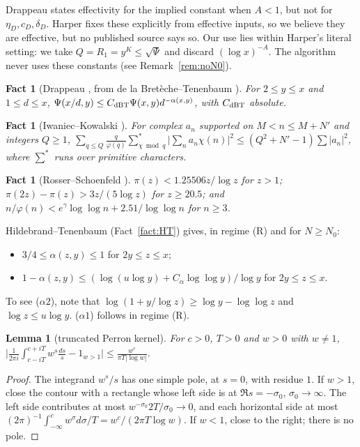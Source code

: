 \documentclass[11pt]{amsart}
\newtheorem{lemma}[theorem]{Lemma}
\newtheorem{fact}[theorem]{Fact}
\theoremstyle{definition}
\begin{document}
\noindent Drappeau states effectivity for the implied constant when $A<1$, but not for $\eta_D,c_D,\delta_D$. Harper fixes
these explicitly from effective inputs, so we believe they are effective, but no published source says so. Our use lies within Harper's
literal setting: we take $Q=R_1=y^K\le\sqrt{\Psi}$ and discard $(\log x)^{-A}$. The algorithm never uses these constants (see
Remark~\ref{rem:noN0}).

\begin{fact}[Drappeau {\cite[Lemme~1(i)]{drappeau2015}}, from de la Bret\`eche--Tenenbaum {\cite[Thm.~2.4(i)]{dbt2005}}]\label{fact:dBT}
For $2\le y\le x$ and $1\le d\le x$, $\Psi(x/d,y)\le C_{\rm dBT}\Psi(x,y)d^{-\alpha(x,y)}$, with $C_{\rm dBT}$ absolute.
\end{fact}

\begin{fact}[Iwaniec--Kowalski {\cite[Thm.~7.13]{ik2004}}]\label{fact:IK}
For complex $a_n$ supported on $M<n\le M+N'$ and integers $Q\ge1$,
$\sum_{q\le Q}\frac q{\varphi(q)}\sum^*_{\chi\bmod q}\bigl|\sum_na_n\chi(n)\bigr|^2\le(Q^2+N'-1)\sum|a_n|^2$, where $\sum^*$ runs over primitive characters.
\end{fact}

\begin{fact}[Rosser--Schoenfeld \cite{rs1962}]\label{fact:RS}
$\pi(z)<1.25506z/\log z$ for $z>1$; $\pi(2z)-\pi(z)>3z/(5\log z)$ for $z\ge20.5$; and $n/\varphi(n)<e^\gamma\log\log n+2.51/\log\log n$ for $n\ge3$.
\end{fact}

\noindent Hildebrand--Tenenbaum (Fact~\ref{fact:HT}) gives, in regime (R) and for $N\ge N_0$:
\begin{itemize}
\item[($\alpha1$)] $3/4\le\alpha(z,y)\le1$ for $2y\le z\le x$;
\item[($\alpha2$)] $1-\alpha(z,y)\le(\log(u\log y)+C_\alpha\log\log y)/\log y$ for $2y\le z\le x$.
\end{itemize}
To see ($\alpha2$), note that $\log(1+y/\log z)\ge\log y-\log\log z$ and $\log z\le u\log y$. ($\alpha1$) follows in regime (R).

\begin{lemma}[truncated Perron kernel]\label{lem:perron}
For $c>0$, $T>0$ and $w>0$ with $w\ne1$,
$\bigl|\frac1{2\pi i}\int_{c-iT}^{c+iT}w^s\frac{ds}s-1_{w>1}\bigr|\le\frac{w^c}{\pi T|\log w|}$.
\end{lemma}

\begin{proof}
The integrand $w^s/s$ has one simple pole, at $s=0$, with residue $1$. If $w>1$, close the contour with a rectangle whose left side is at
$\Re s=-\sigma_0$, $\sigma_0\to\infty$. The left side contributes at most $w^{-\sigma_0}2T/\sigma_0\to0$, and each horizontal side at most
$(2\pi)^{-1}\int_{-\infty}^cw^\sigma d\sigma/T=w^c/(2\pi T\log w)$. If $w<1$, close to the right; there is no pole.
\end{proof}
\end{document}

